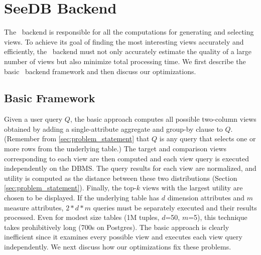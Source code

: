 \chapter{SeeDB Backend}
\label{subsec:seedb_backend}

The \SeeDB\ backend is responsible for all the computations for 
generating and selecting views. 
To achieve its goal of finding the most
interesting views accurately and efficiently, the \SeeDB\ backend must not only accurately
estimate the quality of a large number of views but also minimize total processing time.
We first describe the basic \SeeDB\ backend framework and then discuss our optimizations.


\section{Basic Framework}
\label{sec:basic_framework}
Given a user query $Q$, the basic approach computes all possible two-column
views obtained by adding a single-attribute aggregate and group-by clause to
$Q$. (Remember from \ref{sec:problem_statement} that $Q$ is any query that
selects one or more rows from the underlying table.) The target and comparison
views corresponding to each view are then computed and each view query is
executed independently on the DBMS. The query results for each view are
normalized, and utility is computed as the distance between these two
distributions (Section \ref{sec:problem_statement}).
Finally, the top-$k$ views with the largest utility are chosen to be displayed.
If the underlying table has $d$ dimension attributes and $m$ measure attributes,
$2\ast d \ast m$ queries must be separately executed and their results
processed. Even for modest size tables (1M tuples, $d$=50, $m$=5), this
technique takes prohibitively long (700s on Postgres). The basic approach is
clearly inefficient since it examines every possible view and executes each view
query independently. We next discuss how our optimizations fix these problems. 

